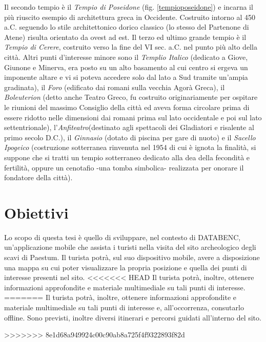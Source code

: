 Il secondo tempio è il \emph{Tempio di Poseidone} (fig. \ref{tempioposeidone}) e incarna il più riuscito esempio di architettura greca in Occidente. Costruito intorno al 450 a.C. seguendo lo stile architettonico dorico classico (lo stesso del Partenone di Atene) risulta orientato da ovest ad est. Il terzo ed ultimo grande tempio è il \emph{Tempio di Cerere}, costruito verso la fine del VI sec. a.C. nel punto più alto della città. Altri punti d'interesse minore sono il \emph{Templio Italico} (dedicato a Giove, Giunone e Minerva, era posto su un alto basamento al cui centro si ergeva un imponente altare e vi si poteva accedere solo dal lato a Sud tramite un'ampia gradinata), il \emph{Foro} (edificato dai romani sulla vecchia Agorà Greca), il \emph{Boleuterion} (detto anche Teatro Greco, fu costruito originariamente per ospitare le riunioni del massimo Consiglio della città ed aveva forma circolare prima di essere ridotto nelle dimensioni dai romani prima sul lato occidentale e poi sul lato settentrionale), l'\emph{Anfiteatro}(destinato agli spettacoli dei Gladiatori e risalente al primo secolo D.C.), il \emph{Ginnasio} (dotato di piscina per gare di nuoto) e il \emph{Sacello Ipogeico} (costruzione sotterranea rinvenuta nel 1954 di cui è ignota la finalità, si suppone che si tratti un tempio sotterraneo dedicato alla dea della fecondità e fertilità, oppure un cenotafio -una tomba simbolica- realizzata per onorare il fondatore della città).
\section{Obiettivi}
Lo scopo di questa tesi è quello di sviluppare, nel contesto di DATABENC, un'applicazione mobile che assista i turisti nella visita del sito archeologico degli scavi di Paestum.
Il turista potrà, sul suo dispositivo mobile, avere a disposizione una mappa su cui poter visualizzare la propria posizione e quella dei punti di interesse presenti nel sito.
<<<<<<< HEAD
Il turista potrà, inoltre, ottenere informazioni approfondite e materiale multimediale su tali punti di interesse. 
=======
Il turista potrà, inoltre, ottenere informazioni approfondite e materiale multimediale su tali punti di interesse e, all'occorrenza, consutarlo offline.
Sono previsti, inoltre diversi itinerari e percorsi guidati all'interno del sito.

>>>>>>> 8e1d68a949924c00c90ab8a725f4f9322893f82d





\clearpage{\pagestyle{empty}\cleardoublepage}

